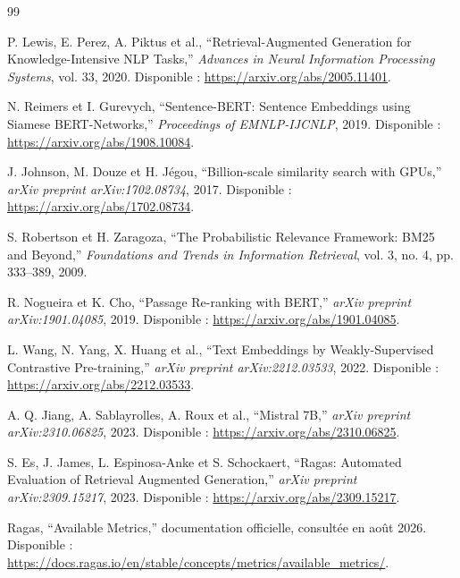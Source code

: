 \documentclass[12pt,a4paper,oneside]{report}
\begin{document}
\clearpage
{}
\begin{thebibliography}{99}

P. Lewis, E. Perez, A. Piktus et al., ``Retrieval-Augmented Generation for
Knowledge-Intensive NLP Tasks,'' \textit{Advances in Neural Information
Processing Systems}, vol. 33, 2020. Disponible : \url{https://arxiv.org/abs/2005.11401}.

N. Reimers et I. Gurevych, ``Sentence-BERT: Sentence Embeddings using Siamese
BERT-Networks,'' \textit{Proceedings of EMNLP-IJCNLP}, 2019. Disponible :
\url{https://arxiv.org/abs/1908.10084}.

J. Johnson, M. Douze et H. Jégou, ``Billion-scale similarity search with
GPUs,'' \textit{arXiv preprint arXiv:1702.08734}, 2017. Disponible :
\url{https://arxiv.org/abs/1702.08734}.

S. Robertson et H. Zaragoza, ``The Probabilistic Relevance Framework: BM25 and
Beyond,'' \textit{Foundations and Trends in Information Retrieval}, vol. 3,
no. 4, pp. 333--389, 2009.

R. Nogueira et K. Cho, ``Passage Re-ranking with BERT,'' \textit{arXiv preprint
arXiv:1901.04085}, 2019. Disponible : \url{https://arxiv.org/abs/1901.04085}.

L. Wang, N. Yang, X. Huang et al., ``Text Embeddings by Weakly-Supervised
Contrastive Pre-training,'' \textit{arXiv preprint arXiv:2212.03533}, 2022.
Disponible : \url{https://arxiv.org/abs/2212.03533}.

A. Q. Jiang, A. Sablayrolles, A. Roux et al., ``Mistral 7B,'' \textit{arXiv
preprint arXiv:2310.06825}, 2023. Disponible : \url{https://arxiv.org/abs/2310.06825}.

S. Es, J. James, L. Espinosa-Anke et S. Schockaert, ``Ragas: Automated
Evaluation of Retrieval Augmented Generation,'' \textit{arXiv preprint
arXiv:2309.15217}, 2023. Disponible : \url{https://arxiv.org/abs/2309.15217}.

Ragas, ``Available Metrics,'' documentation officielle, consultée en août 2026.
Disponible : \url{https://docs.ragas.io/en/stable/concepts/metrics/available_metrics/}.


\end{thebibliography}
\end{document}

